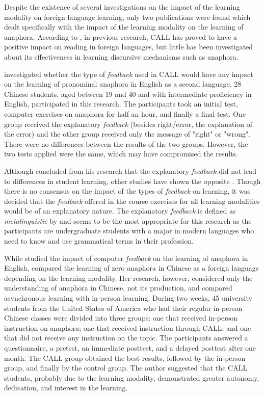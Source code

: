 \documentclass{textolivre}
\begin{document}
Despite the existence of several investigations on the impact of the
learning modality on foreign language learning, only two publications
were found which dealt specifically with the impact of the learning
modality on the learning of anaphora. According to \textcite[p.~72]{li_engaging_2014}, in
previous research, CALL has proved to have a positive impact on reading
in foreign languages, but little has been investigated about its
effectiveness in learning discursive mechanisms such as anaphora.

\textcite{liu_acquisition_2010} investigated whether the type of \emph{feedback} used in CALL
would have any impact on the learning of pronominal anaphora in English
as a second language. 28 Chinese students, aged between 19 and 40 and
with intermediate proficiency in English, participated in this research.
The participants took an initial test, computer exercises on anaphora
for half an hour, and finally a final test. One group received the
explanatory \emph{feedback} (besides right/error, the explanation of the
error) and the other group received only the message of "right" or
"wrong". There were no differences between the results of the two
groups. However, the two tests applied were the same, which may have
compromised the results.

Although \textcite{liu_acquisition_2010} concluded from his research that the explanatory
\emph{feedback} did not lead to differences in student learning, other
studies have shown the opposite \cite{lyster_corrective_1997,heift_corrective_2004,mackey_pushing_2006}. 
Though there is no consensus on the impact of the
types of \emph{feedback} on learning, it was decided that the
\emph{feedback} offered in the course exercises for all learning
modalities would be of an explanatory nature. The explanatory
\emph{feedback} is defined as \emph{metalinguistic} by \textcite[p.~47]{lyster_corrective_1997}
and seems to be the most appropriate for this research as
the participants are undergraduate students with a major in modern
languages who need to know and use grammatical terms in their
profession.

While \textcite{liu_acquisition_2010} studied the impact of computer \emph{feedback} on the
learning of anaphora in English, \textcite{li_engaging_2014} compared the learning of zero
anaphora in Chinese as a foreign language depending on the learning
modality. Her research, however, considered only the understanding of
anaphora in Chinese, not its production, and compared asynchronous
learning with in-person learning. During two weeks, 45 university
students from the United States of America who had their regular
in-person Chinese classes were divided into three groups: one that
received in-person instruction on anaphora; one that received
instruction through CALL; and one that did not receive any instruction
on the topic. The participants answered a questionnaire, a pretest, an
immediate posttest, and a delayed posttest after one month. The CALL
group obtained the best results, followed by the in-person group, and
finally by the control group. The author suggested that the CALL
students, probably due to the learning modality, demonstrated greater
autonomy, dedication, and interest in the learning.
\end{document}

